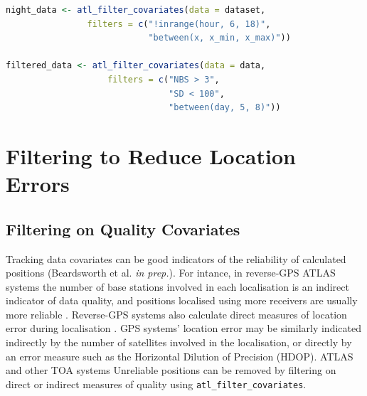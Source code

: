 \documentclass[10pt,paper=a4,headings=standardclasses
]{scrartcl}
\begin{document}
\begin{lstlisting}[float, language=R, style=customR, caption = {
    Data can be filtered by a temporal or a spatio-temporal range using {atl\_filter\_covariates}. 
    Filter predicates are passed to the \texttt{filters} argument as a character vector. 
    Only rows in the data satisfying all the conditions passed as filters are retained. 
    Here, the first example shows how nighttime data can be retained using a predicate (\texttt{inrange} from \texttt{data.table}) that determine whether the value of `hour' is between 6 and 18, and also within a range of X coordinates.
    The second example retains calculated using $>$ 3 base stations (\texttt{NBS}), with location error (\texttt{SD}) $<$ 100, and data between an arbitrary day 5 and day 8.
    }]
night_data <- atl_filter_covariates(data = dataset,
                filters = c("!inrange(hour, 6, 18)",
                            "between(x, x_min, x_max)"))

filtered_data <- atl_filter_covariates(data = data,
                    filters = c("NBS > 3",
                                "SD < 100",
                                "between(day, 5, 8)"))                            
\end{lstlisting}

\section{Filtering to Reduce Location Errors}

\subsection{Filtering on Quality Covariates}

Tracking data covariates can be good indicators of the reliability of calculated positions (Beardsworth et al. \textit{in prep.}).
For intance, in reverse-GPS ATLAS systems the number of base stations involved in each localisation is an indirect indicator of data quality, and positions localised using more receivers are usually more reliable \citep[the minimum required for an ATLAS localisation is 3; see][]{weiser2016}.
Reverse-GPS systems also calculate direct measures of location error during localisation \citep{maccurdy2009, maccurdy2019, weiser2016}.
GPS systems' location error may be similarly indicated indirectly by the number of satellites involved in the localisation, or directly by an error measure such as the Horizontal Dilution of Precision (HDOP).
ATLAS and other TOA systems 
Unreliable positions can be removed by filtering on direct or indirect measures of quality using \texttt{atl\_filter\_covariates}.
\end{document}
